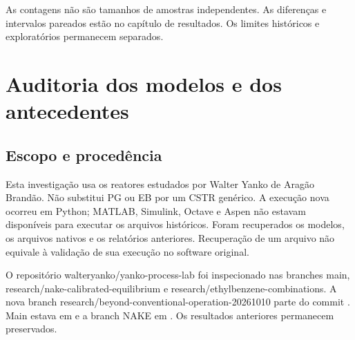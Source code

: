 \documentclass[
  11pt,
  letterpaper,
]{article}
\begin{document}
As contagens não são tamanhos de amostras independentes. As diferenças e
intervalos pareados estão no capítulo de resultados. Os limites
históricos e exploratórios permanecem separados.

\clearpage
\tableofcontents

\hypertarget{auditoria-dos-modelos-e-dos-antecedentes}{%
\section{Auditoria dos modelos e dos
antecedentes}\label{auditoria-dos-modelos-e-dos-antecedentes}}

\hypertarget{escopo-e-proceduxeancia}{%
\subsection{Escopo e procedência}\label{escopo-e-proceduxeancia}}

Esta investigação usa os reatores estudados por Walter Yanko de Aragão
Brandão. Não substitui PG ou EB por um CSTR genérico. A execução nova
ocorreu em Python; MATLAB, Simulink, Octave e Aspen não estavam
disponíveis para executar os arquivos históricos. Foram recuperados os
modelos, os arquivos nativos e os relatórios anteriores. Recuperação de
um arquivo não equivale à validação de sua execução no software
original.

O repositório walteryanko/yanko-process-lab foi inspecionado nas
branches main, research/nake-calibrated-equilibrium e
research/ethylbenzene-combinations. A nova branch
research/beyond-conventional-operation-20261010 parte do commit
\texttt{}. Main estava em
\texttt{} e a branch NAKE em
\texttt{}. Os resultados anteriores
permanecem preservados.
\end{document}
